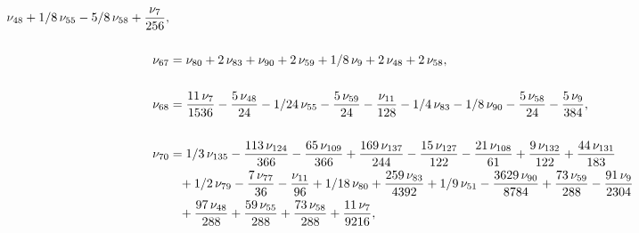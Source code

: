 \documentclass[a4paper,12pt, DIV=14, BCOR=5mm, twoside, headsepline, numbers=noenddot]{scrbook}
\begin{document}
\begin{align}
\begin{aligned}
\nu_{{48}}+1/8\,\nu_{{55}}-5/8\,\nu_{{58}}+{\frac {\nu_{{7}}}{256}},\\
\\
\nu_{{67}}&=\nu_{{80}}+2\,\nu_{{83}}+\nu_{{90}}+2\,\nu_{{59}}+1/8\,\nu_
{{9}}+2\,\nu_{{48}}+2\,\nu_{{58}}, \\
\\
\nu_{{68}}&={\frac {11\,\nu_{{7}}}{
1536}}-{\frac {5\,\nu_{{48}}}{24}}-1/24\,\nu_{{55}}-{\frac {5\,\nu_{{
59}}}{24}}-{\frac {\nu_{{11}}}{128}}-1/4\,\nu_{{83}}-1/8\,\nu_{{90}}-{
\frac {5\,\nu_{{58}}}{24}}-{\frac {5\,\nu_{{9}}}{384}}, \\
\\
\nu_{{70}}&=1/3
\,\nu_{{135}}-{\frac {113\,\nu_{{124}}}{366}}-{\frac {65\,\nu_{{109}}
}{366}}+{\frac {169\,\nu_{{137}}}{244}}-{\frac {15\,\nu_{{127}}}{122}}
-{\frac {21\,\nu_{{108}}}{61}}+{\frac {9\,\nu_{{132}}}{122}}+{\frac {
44\,\nu_{{131}}}{183}}\\
 &\hphantom{=}+1/2\,\nu_{{79}}-{\frac {7\,\nu_{{77}}}{36}}-{
\frac {\nu_{{11}}}{96}}+1/18\,\nu_{{80}}+{\frac {259\,\nu_{{83}}}{4392
}}+1/9\,\nu_{{51}}-{\frac {3629\,\nu_{{90}}}{8784}}+{\frac {73\,\nu_{{
59}}}{288}}-{\frac {91\,\nu_{{9}}}{2304}}\\
 &\hphantom{=}+{\frac {97\,\nu_{{48}}}{288}
}+{\frac {59\,\nu_{{55}}}{288}}+{\frac {73\,\nu_{{58}}}{288}}+{\frac {
11\,\nu_{{7}}}{9216}}, 
\end{aligned}
\end{align}
\end{document}
